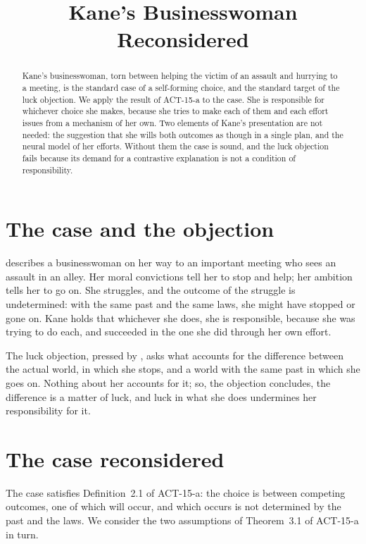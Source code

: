 \documentclass{situationist-preprint}
\title{Kane's Businesswoman Reconsidered}
\begin{document}
\maketitle

\begin{abstract}
Kane's businesswoman, torn between helping the victim of an assault and hurrying to a meeting, is the standard case of a self-forming choice, and the standard target of the luck objection. We apply the result of ACT-15-a to the case. She is responsible for whichever choice she makes, because she tries to make each of them and each effort issues from a mechanism of her own. Two elements of Kane's presentation are not needed: the suggestion that she wills both outcomes as though in a single plan, and the neural model of her efforts. Without them the case is sound, and the luck objection fails because its demand for a contrastive explanation is not a condition of responsibility.
\end{abstract}

\section{The case and the objection}

\citet{Kane1996,Kane1999} describes a businesswoman on her way to an important meeting who sees an assault in an alley. Her moral convictions tell her to stop and help; her ambition tells her to go on. She struggles, and the outcome of the struggle is undetermined: with the same past and the same laws, she might have stopped or gone on. Kane holds that whichever she does, she is responsible, because she was trying to do each, and succeeded in the one she did through her own effort.

The luck objection, pressed by \citet{Mele2006}, asks what accounts for the difference between the actual world, in which she stops, and a world with the same past in which she goes on. Nothing about her accounts for it; so, the objection concludes, the difference is a matter of luck, and luck in what she does undermines her responsibility for it.

\section{The case reconsidered}

The case satisfies Definition~2.1 of ACT-15-a: the choice is between competing outcomes, one of which will occur, and which occurs is not determined by the past and the laws. We consider the two assumptions of Theorem~3.1 of ACT-15-a in turn.
\end{document}
